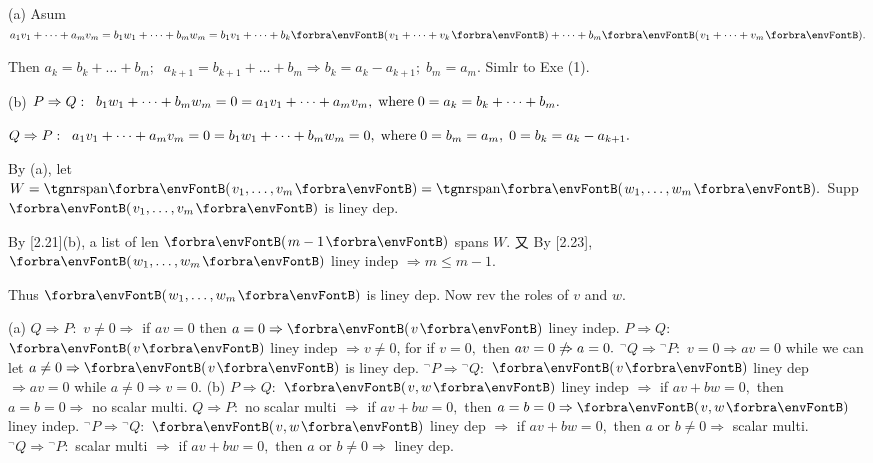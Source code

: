 \par\quad
(a) Asum $a_1v_1+\dots+a_mv_m=b_1w_1+\dots+b_mw_m=b_1v_1+\dots+b_k\Par{v_1+\dots+v_k}+\dots+b_m\Par{v_1+\dots+v_m}.$\par\quad\Ha
Then $a_k=b_k+\dots+b_m;\;\;a_{k+1}=b_{k+1}+\dots+b_m\Rightarrow b_k=a_k-a_{k+1};\;b_m=a_m.$ Simlr to Exe (1).\vspace{4pt}\par\quad
(b) $P\Rightarrow Q:\;\;b_1 w_1+\dots+b_m w_m=0=a_1 v_1+\dots+a_m v_m,\text{\;where\;}0=a_k=b_k+\dots+b_m.$\par\quad\Hb
$Q\Rightarrow P:\;\;a_1 v_1+\dots+a_m v_m=0=b_1 w_1+\dots+b_m w_m=0, \text{\;where\;} 0=b_m=a_m,\;0=b_k=a_k-a_{k+1}.$\vspace{4pt}\par\quad\Hb
\Or By (a), let $W=\Span{v_1,\dots,v_m}=\Span{w_1,\dots,w_m}.$ Supp $\Par{v_1,\dots,v_m}$ is liney dep.\par\quad\Hb
By [2.21](b), a list of len $\Par{m-1}$ spans $W.$ 又 By [2.23], $\Par{w_1,\dots,w_m}$ liney indep $\Rightarrow m\leqslant m-1.$\par\quad\Hb
Thus $\Par{w_1,\dots,w_m}$ is liney dep. Now rev the roles of $v$ and $w.$\PfEnd
\SepLine

(a) $Q\Rightarrow P:$ $v\neq 0\Rightarrow$ if $av=0$ then $a=0\Rightarrow\Par{v}$ liney indep.\parSol{\Ha}
$P\Rightarrow Q:$ $\Par{v}$ liney indep $\Rightarrow v\neq 0$, for if $v=0,$ then $av=0\notRightarrow a=0.$\parSol{\Ha}
${}^\neg Q\Rightarrow{}^\neg P:$ $v=0\Rightarrow av=0$ while we can let $a\neq 0\Rightarrow\Par{v}$ is liney dep.\parSol{\Ha}
${}^\neg P\Rightarrow{}^\neg Q:$ $\Par{v}$ liney dep $\Rightarrow av=0$ while $a\neq 0\Rightarrow v=0.$\parSol{\vspace{4pt}}
(b) $P\Rightarrow Q:$ $\Par{v,w}$ liney indep $\Rightarrow$  if $av+bw=0,$ then $a=b=0\Rightarrow$ no scalar multi.\parSol{\Hb}
$Q\Rightarrow P:$ no scalar multi $\Rightarrow$ if $av+bw=0,$ then $a=b=0\Rightarrow\Par{v,w}$ liney indep.\parSol{\Hb}
${}^\neg P\Rightarrow{}^\neg Q:$ $\Par{v,w}$ liney dep $\Rightarrow$ if $av+bw=0,$ then $a$ or $b\neq 0\Rightarrow$ scalar multi.\parSol{\Hb}
${}^\neg Q\Rightarrow{}^\neg P:$ scalar multi $\Rightarrow$ if $av+bw=0,$ then $a$ or $b\neq 0\Rightarrow$ liney dep.\PfEnd
\SepLine

